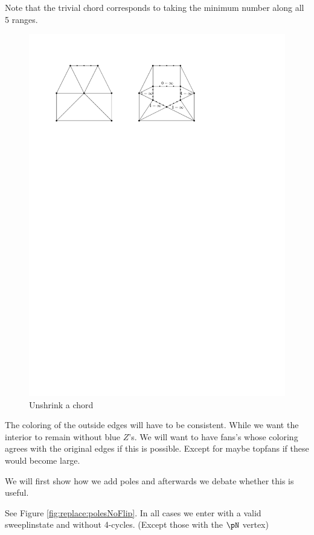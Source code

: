 Note that the trivial chord corresponds to taking the minimum number along all 5 ranges.
\begin{figure}[h]
  \centering
  \includegraphics[scale=1]{chordReplace/img/unshrunk}
  \caption{Unshrink a chord}
  \label{fig:replace:unshrunk}
\end{figure}


 The coloring of the outside edges will have to be consistent. While we want the interior to remain without blue $Z$'s. We will want to have fans's whose coloring agrees with the original edges if this is possible. Except for maybe topfans if these would become large.



We will first show how we add poles and afterwards we debate whether this is useful.

See Figure \ref{fig:replace:polesNoFlip}. In all cases we enter with a valid sweeplinstate and without 4-cycles. (Except those with the $\pN$ vertex)

